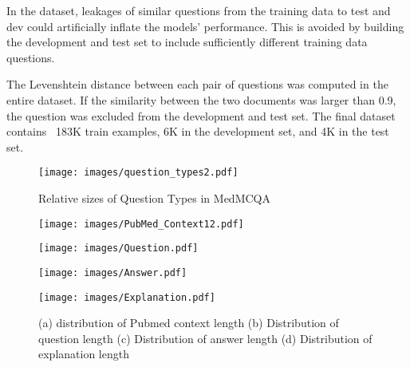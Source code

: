 \documentclass[pmlr,twocolumn,10pt]{jmlr}
\begin{document}
In the dataset, leakages of similar questions from the training data to test and dev could artificially inflate the models' performance. This is avoided by building the development and test set to include sufficiently different training data questions. 

The Levenshtein distance between each pair of questions was computed in the entire dataset. If the similarity between the two documents was larger than 0.9, the question was excluded from the development and test set. The final dataset contains ~183K train examples, 6K in the development set, and 4K in the test set.

\begin{figure}
\centering
  \texttt{[image: images/question\_types2.pdf]}
  \caption{ \footnotesize Relative sizes of Question Types in MedMCQA}
  \label{fig:question_types}
\end{figure}

\begin{figure}[ht]
\centering
  \begin{minipage}[b]{0.50\linewidth}
   
    \texttt{[image: images/PubMed\_Context12.pdf]}
    
    \label{fig:stasdet0}
    \vspace{2ex}
  \end{minipage}\begin{minipage}[b]{0.50\linewidth}

    \texttt{[image: images/Question.pdf]} 
    \label{fig:stasdet1}
    \vspace{2ex}
  \end{minipage} 
  \begin{minipage}[b]{0.50\linewidth}

    \texttt{[image: images/Answer.pdf]} 
    \label{fig:stasdet2}
    \vspace{2ex}
  \end{minipage}\begin{minipage}[b]{0.50\linewidth}

    \texttt{[image: images/Explanation.pdf]}
    \label{fig:stasdet3}
    \vspace{2ex}
  \end{minipage}
  \caption{ \footnotesize (a) distribution of Pubmed context length (b) Distribution of question length (c) Distribution of answer length (d) Distribution of explanation length }
  \label{fig:stasdet}
\end{figure}
\end{document}
